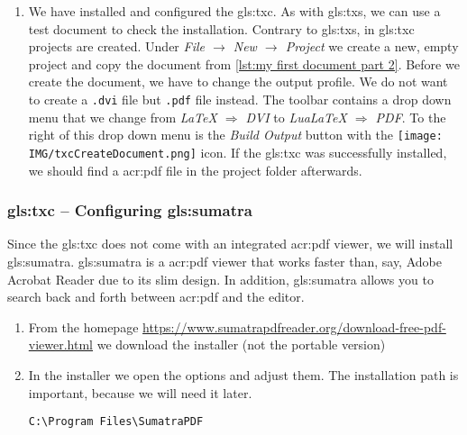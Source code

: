 \begin{enumerate}
	 \item We have installed and configured the \gls{gls:txc}. As with \gls{gls:txs}, we can use a test document to check the installation. Contrary to \gls{gls:txs}, in \gls{gls:txc} projects are created. Under \textit{File $\rightarrow$ New $\rightarrow$ Project} we create a new, empty project and copy the document from \autoref{lst:my first document part 2}. Before we create the document, we have to change the output profile. We do not want to create a \verb|.dvi| file but \verb|.pdf| file instead. The toolbar contains a drop down menu that we change from \textit{LaTeX $\Rightarrow$ DVI} to \textit{LuaLaTeX $\Rightarrow$ PDF}. To the right of this drop down menu is the \textit{Build Output} button with the \texttt{[image: IMG/txcCreateDocument.png]} icon. If the \gls{gls:txc} was successfully installed, we should find a \ac{acr:pdf} file in the project folder afterwards.
\end{enumerate}




\subsubsection{\gls*{gls:txc} -- Configuring \gls*{gls:sumatra}}
\label{sec:txc:sumatra}
Since the \gls{gls:txc} does not come with an integrated \ac{acr:pdf} viewer, we will install \gls{gls:sumatra}. \gls{gls:sumatra} is a \ac{acr:pdf} viewer that works faster than, say, Adobe Acrobat Reader due to its slim design. In addition, \gls{gls:sumatra} allows you to search back and forth between \ac{acr:pdf} and the editor.

\begin{enumerate}
	\item From the homepage \url{https://www.sumatrapdfreader.org/download-free-pdf-viewer.html} we download the installer (not the portable version)
	\item In the installer we open the options and adjust them. The installation path is important, because we will need it later.
	\begin{lstlisting}[caption=Installation path for \gls{gls:sumatra}]
		C:\Program Files\SumatraPDF
	\end{lstlisting}
\end{enumerate}

